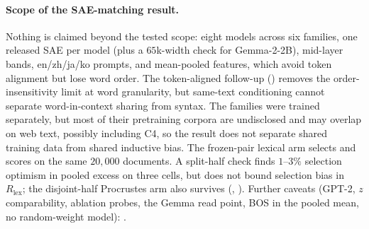 \paragraph{Scope of the SAE-matching result.}\label{sec:limitations} Nothing is claimed beyond
the tested scope: eight models across six families, one released SAE per model (plus a $65$k-width check for
Gemma-2-2B), mid-layer bands, en/zh/ja/ko prompts, and mean-pooled
features, which avoid token alignment but lose word order. The token-aligned follow-up
() removes the order-insensitivity limit at word granularity, but
same-text conditioning cannot separate word-in-context sharing from syntax. The families were trained separately, but most of
their pretraining corpora are undisclosed and may overlap on web text, possibly including C4, so the
result does not separate shared training data from shared inductive bias. The frozen-pair lexical arm selects and scores on the same $20{,}000$
documents. A split-half check finds $1$--$3\%$ selection optimism in pooled excess on three cells,
but does not bound selection bias in $R_{\text{lex}}$; the disjoint-half Procrustes arm also survives
(, ). Further caveats
(GPT-2, $z$ comparability, ablation probes, the Gemma read point, BOS in the pooled mean,
no random-weight model):
.
